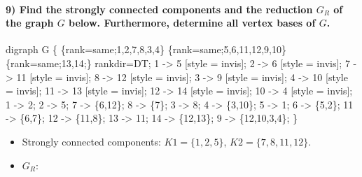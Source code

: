 \documentclass[
]{article}
\newenvironment{Shaded}{}{}
\newcommand{\NormalTok}[1]{#1}
\providecommand{\tightlist}{%
  \setlength{\itemsep}{0pt}\setlength{\parskip}{0pt}}
\begin{document}
\hypertarget{find-the-strongly-connected-components-and-the-reduction-g_r-of-the-graph-g-below.-furthermore-determine-all-vertex-bases-of-g.}{%
\paragraph{\texorpdfstring{9) Find the strongly connected components and
the reduction \(G_R\) of the graph \(G\) below. Furthermore, determine
all vertex bases of
\(G\).}{9) Find the strongly connected components and the reduction G\_R of the graph G below. Furthermore, determine all vertex bases of G.}}\label{find-the-strongly-connected-components-and-the-reduction-g_r-of-the-graph-g-below.-furthermore-determine-all-vertex-bases-of-g.}}

\begin{Shaded}
\begin{Highlighting}[]
\NormalTok{digraph G \{ }
\NormalTok{    \{rank=same;1,2,7,8,3,4\}}
\NormalTok{    \{rank=same;5,6,11,12,9,10\}}
\NormalTok{    \{rank=same;13,14;\}}
\NormalTok{    rankdir=DT;}
\NormalTok{        1 {-}\textgreater{} 5 [style = invis];}
\NormalTok{        2 {-}\textgreater{} 6 [style = invis];}
\NormalTok{        7 {-}\textgreater{} 11 [style = invis];}
\NormalTok{        8 {-}\textgreater{} 12 [style = invis];}
\NormalTok{        3 {-}\textgreater{} 9 [style = invis];}
\NormalTok{        4 {-}\textgreater{} 10 [style = invis];}
\NormalTok{        11 {-}\textgreater{} 13 [style = invis];}
\NormalTok{        12 {-}\textgreater{} 14 [style = invis];}
\NormalTok{        10 {-}\textgreater{} 4 [style = invis];}
\NormalTok{        1 {-}\textgreater{} 2;}
\NormalTok{        2 {-}\textgreater{} 5;}
\NormalTok{        7 {-}\textgreater{} \{6,12\};}
\NormalTok{        8 {-}\textgreater{} \{7\};}
\NormalTok{        3 {-}\textgreater{} 8;}
\NormalTok{        4 {-}\textgreater{} \{3,10\};}
\NormalTok{        5 {-}\textgreater{} 1;}
\NormalTok{        6 {-}\textgreater{} \{5,2\};}
\NormalTok{        11 {-}\textgreater{} \{6,7\};}
\NormalTok{        12 {-}\textgreater{} \{11,8\};}
\NormalTok{        13 {-}\textgreater{} 11;}
\NormalTok{        14 {-}\textgreater{} \{12,13\};}
\NormalTok{        9 {-}\textgreater{} \{12,10,3,4\};}
\NormalTok{    \}}
\end{Highlighting}
\end{Shaded}

\begin{itemize}
\tightlist
\item
  Strongly connected components: \(K1 = \{1,2,5\}\),
  \(K2 = \{7,8,11,12\}\).
\item
  \(G_R\):
\end{itemize}
\end{document}
